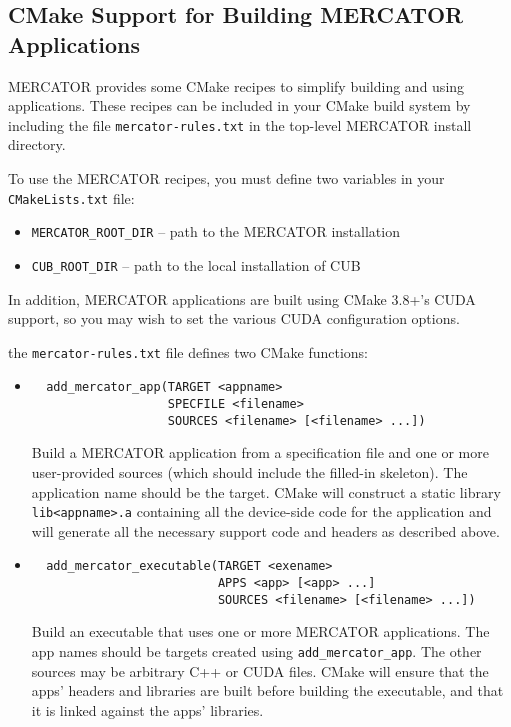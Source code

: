 \documentclass[11pt]{article}
\begin{document}
\subsection{CMake Support for Building MERCATOR Applications}

MERCATOR provides some CMake recipes to simplify building and using
applications.  These recipes can be included in your CMake build
system by including the file \texttt{mercator-rules.txt} in the
top-level MERCATOR install directory.

To use the MERCATOR recipes, you must define two variables in your
\texttt{CMakeLists.txt} file:
\begin{itemize}
 \item \texttt{MERCATOR_ROOT_DIR} -- path to the MERCATOR installation

  \item \texttt{CUB_ROOT_DIR} -- path to the local installation of CUB
\end{itemize}
In addition, MERCATOR applications are built using CMake 3.8+'s CUDA
support, so you may wish to set the various CUDA configuration options.

the \texttt{mercator-rules.txt} file defines two CMake functions:
\begin{itemize}

\item
\begin{verbatim}
  add_mercator_app(TARGET <appname>
                   SPECFILE <filename>
                   SOURCES <filename> [<filename> ...])
\end{verbatim}

Build a MERCATOR application from a specification file and one or more
user-provided sources (which should include the filled-in skeleton).
The application name should be the target.  CMake will construct a
static library \texttt{lib<appname>.a} containing all the device-side
code for the application and will generate all the necessary support
code and headers as described above.

\item
\begin{verbatim}
  add_mercator_executable(TARGET <exename>
                          APPS <app> [<app> ...]
                          SOURCES <filename> [<filename> ...])
\end{verbatim}

Build an executable that uses one or more MERCATOR applications.
The app names should be targets created using \texttt{add_mercator_app}.
The other sources may be arbitrary C++ or CUDA files.  CMake will
ensure that the apps' headers and libraries are built before building
the executable, and that it is linked against the apps' libraries.

\end{itemize}
\end{document}
